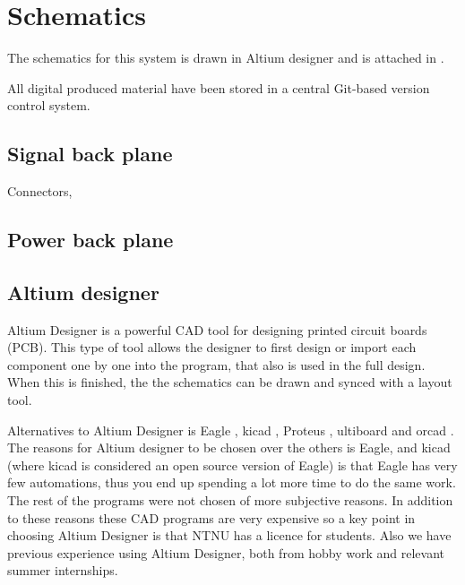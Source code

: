 \section{Schematics}
The schematics for this system is drawn in Altium designer and is attached in .

All digital produced material have been stored in a central Git-based version control system. 

\subsection{Signal back plane}
Connectors, 

\subsection{Power back plane}


\subsection{Altium designer}
\label{altium}
Altium Designer \citep{altium} is a powerful CAD tool for designing printed circuit boards (PCB). This type of tool allows the designer to first design or import each component one by one into the program, that also is used in the full design. When this is finished, the the schematics can be drawn and synced with a layout tool.

Alternatives to Altium Designer is Eagle \citep{eagle}, kicad \citep{kicad}, Proteus \citep{proteus}, ultiboard \citep{ultiboard} and orcad \citep{orcad}. The reasons for Altium designer to be chosen over the others is Eagle, and kicad (where  kicad is considered an open source version of Eagle) is that Eagle has very few automations, thus you end up spending a lot more time to do the same work. The rest of the programs were not chosen of more subjective reasons. In addition to these reasons these CAD programs are very expensive so a key point in choosing Altium Designer is that NTNU has a licence for students. Also we have previous experience using Altium Designer, both from hobby work and relevant summer internships.